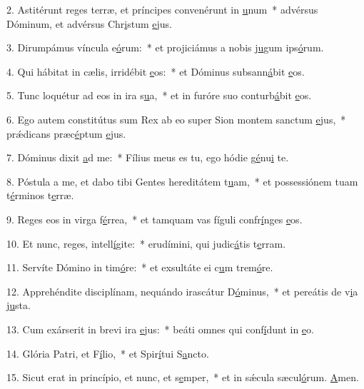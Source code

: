 2. Astitérunt reges terræ, et príncipes convenérunt in \uline{u}num~* advérsus Dóminum, et advérsus Chr\uline{i}stum \uline{e}jus.\par 
3. Dirumpámus víncula e\uline{ó}rum:~* et projiciámus a nobis j\uline{u}gum ips\uline{ó}rum.\par 
4. Qui hábitat in cælis, irridébit \uline{e}os:~* et Dóminus subsann\uline{á}bit \uline{e}os.\par 
5. Tunc loquétur ad eos in ira s\uline{u}a,~* et in furóre suo conturb\uline{á}bit \uline{e}os.\par 
6. Ego autem constitútus sum Rex ab eo super Sion montem sanctum \uline{e}jus,~* prǽdicans præc\uline{é}ptum \uline{e}jus.\par 
7. Dóminus dixit \uline{a}d me:~* Fílius meus es tu, ego hódie g\uline{é}nu\uline{i} te.\par 
8. Póstula a me, et dabo tibi Gentes hereditátem t\uline{u}am,~* et possessiónem tuam t\uline{é}rminos t\uline{e}rræ.\par 
9. Reges eos in virga f\uline{é}rrea,~* et tamquam vas fíguli confr\uline{í}nges \uline{e}os.\par 
10. Et nunc, reges, intell\uline{í}gite:~* erudímini, qui judic\uline{á}tis t\uline{e}rram.\par 
11. Servíte Dómino in tim\uline{ó}re:~* et exsultáte ei c\uline{u}m trem\uline{ó}re.\par 
12. Apprehéndite disciplínam, nequándo irascátur D\uline{ó}minus,~* et pereátis de v\uline{i}a j\uline{u}sta.\par 
13. Cum exárserit in brevi ira \uline{e}jus:~* beáti omnes qui conf\uline{í}dunt in \uline{e}o.\par 
14. Glória Patri, et F\uline{í}lio,~* et Spir\uline{í}tui S\uline{a}ncto.\par 
15. Sicut erat in princípio, et nunc, et s\uline{e}mper,~* et in sǽcula sæcul\uline{ó}rum. \uline{A}men.\par 
